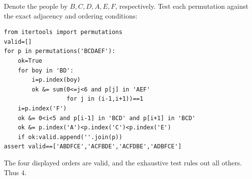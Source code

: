 Denote the people by $B,C,D,A,E,F$, respectively. Test each permutation against the exact adjacency and ordering conditions:
\begin{verbatim}
from itertools import permutations
valid=[]
for p in permutations('BCDAEF'):
    ok=True
    for boy in 'BD':
        i=p.index(boy)
        ok &= sum(0<=j<6 and p[j] in 'AEF'
                  for j in (i-1,i+1))==1
    i=p.index('F')
    ok &= 0<i<5 and p[i-1] in 'BCD' and p[i+1] in 'BCD'
    ok &= p.index('A')<p.index('C')<p.index('E')
    if ok:valid.append(''.join(p))
assert valid==['ABDFCE','ACFBDE','ACFDBE','ADBFCE']
\end{verbatim}
The four displayed orders are valid, and the exhaustive test rules out all others. Thus $\boxed4$.
